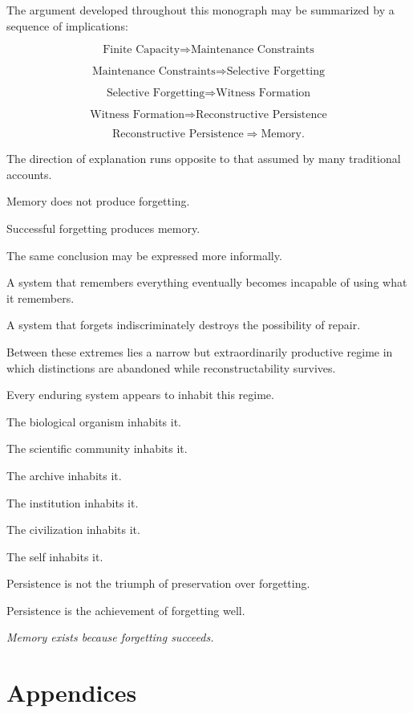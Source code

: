 \documentclass[12pt,oneside]{book}
\theoremstyle{plain} \newtheorem{theorem}{Theorem}[chapter] \newtheorem{lemma}[theorem]{Lemma} \newtheorem{proposition}[theorem]{Proposition} \newtheorem{corollary}[theorem]{Corollary}
\theoremstyle{definition} \newtheorem{definition}[theorem]{Definition} \newtheorem{axiom}[theorem]{Axiom} \newtheorem{construction}[theorem]{Construction}
\theoremstyle{remark} \newtheorem{remark}[theorem]{Remark} \newtheorem{example}[theorem]{Example}
\begin{document}
The argument developed throughout this monograph may be summarized by a sequence of implications:

\[
\text{Finite Capacity}
\Rightarrow
\text{Maintenance Constraints}
\]

\[
\text{Maintenance Constraints}
\Rightarrow
\text{Selective Forgetting}
\]

\[
\text{Selective Forgetting}
\Rightarrow
\text{Witness Formation}
\]

\[
\text{Witness Formation}
\Rightarrow
\text{Reconstructive Persistence}
\]

\[
\text{Reconstructive Persistence}
\Rightarrow
\text{Memory}.
\]

The direction of explanation runs opposite to that assumed by many traditional accounts.

Memory does not produce forgetting.

Successful forgetting produces memory.

The same conclusion may be expressed more informally.

A system that remembers everything eventually becomes incapable of using what it remembers.

A system that forgets indiscriminately destroys the possibility of repair.

Between these extremes lies a narrow but extraordinarily productive regime in which distinctions are abandoned while reconstructability survives.

Every enduring system appears to inhabit this regime.

The biological organism inhabits it.

The scientific community inhabits it.

The archive inhabits it.

The institution inhabits it.

The civilization inhabits it.

The self inhabits it.

Persistence is not the triumph of preservation over forgetting.

Persistence is the achievement of forgetting well.

\bigskip

\begin{center}
\emph{
Memory exists because forgetting succeeds.
}
\end{center}


\newpage 
\section*{Appendices}
\end{document}

